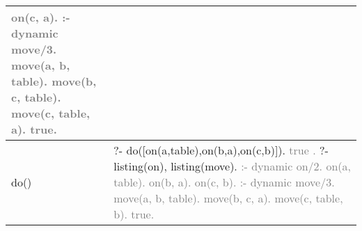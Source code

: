 \documentclass{article}
\begin{document}
\begin{tabular}{|p{6cm}|p{6cm}|}
                    \newline \textcolor{gray}{    on(c, a).}
                    \newline \textcolor{gray}{:- dynamic move/3.}
                    \newline \textcolor{gray}{    move(a, b, table).}
                    \newline \textcolor{gray}{    move(b, c, table).}
                    \newline \textcolor{gray}{    move(c, table, a).}
                    \newline \textcolor{gray}{    true.}\\
                \hline
                    do() & ?- do([on(a,table),on(b,a),on(c,b)]).
                    \newline \textcolor{gray}{    true .}
                    \newline ?- listing(on), listing(move).
                    \newline \textcolor{gray}{:- dynamic on/2.}
                    \newline \textcolor{gray}{    on(a, table).}
                    \newline \textcolor{gray}{    on(b, a).}
                    \newline \textcolor{gray}{    on(c, b).}
                    \newline \textcolor{gray}{:- dynamic move/3.}
                    \newline \textcolor{gray}{    move(a, b, table).}
                    \newline \textcolor{gray}{    move(b, c, a).}
                    \newline \textcolor{gray}{    move(c, table, b).}
                    \newline \textcolor{gray}{    true.}\\
                \hline
            \end{tabular}
\end{document}
